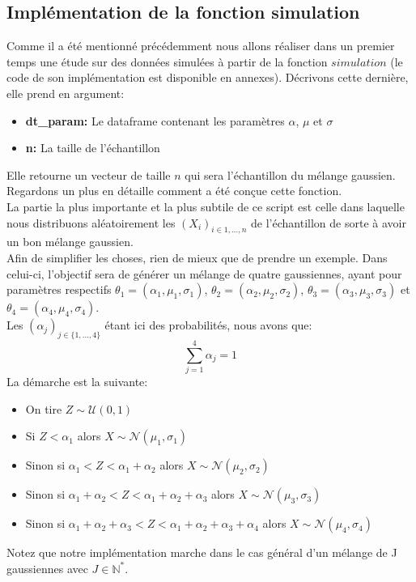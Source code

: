 \documentclass[a4paper,french,10pt]{article}
\begin{document}
\subsection{Implémentation de la fonction simulation}
Comme il a été mentionné précédemment nous allons réaliser dans un premier temps une étude sur des données simulées à partir de la fonction $simulation$ (le code de son implémentation est disponible en annexes). Décrivons cette dernière, elle prend en argument:
\begin{itemize}
	\item \textbf{dt\_param:} Le dataframe contenant les paramètres $\alpha$, $\mu$ et $\sigma$
	\item \textbf{n:} La taille de l'échantillon
\end{itemize}
Elle retourne un vecteur de taille $n$ qui sera l'échantillon du mélange gaussien. \\ Regardons un plus en détaille comment a été conçue cette fonction. \\
La partie la plus importante et la plus subtile de ce script est celle dans laquelle nous distribuons aléatoirement les $(X_i)_{i \in 1,\dots,n}$ de l'échantillon de sorte à avoir un bon mélange gaussien. \\
Afin de simplifier les choses, rien de mieux que de prendre un exemple. Dans celui-ci, l'objectif sera de générer un mélange de quatre gaussiennes, ayant pour paramètres respectifs $\theta_1 = (\alpha_1, \mu_1, \sigma_1)$, $\theta_2 = (\alpha_2, \mu_2, \sigma_2)$, $\theta_3 = (\alpha_3, \mu_3, \sigma_3)$ et $\theta_4 = (\alpha_4, \mu_4, \sigma_4)$. \\
Les $(\alpha_j)_{j \in \{1,\dots,4\}}$ étant ici des probabilités, nous avons que:
\[
	\sum_{j=1}^{4} \alpha_{j} = 1
\]
La démarche est la suivante:
\begin{itemize}
	\item On tire $Z \sim \mathcal{U}(0,1)$
	\item Si $Z < \alpha_1$ alors $X \sim \mathcal{N}(\mu_1, \sigma_1)$
	\item Sinon si $\alpha_1 < Z < \alpha_1 + \alpha_2$ alors $X \sim \mathcal{N}(\mu_2, \sigma_2)$
	\item Sinon si $\alpha_1 + \alpha_2 < Z < \alpha_1 + \alpha_2 + \alpha_3$ alors $X \sim \mathcal{N}(\mu_3, \sigma_3)$
	\item Sinon si $\alpha_1 + \alpha_2 + \alpha_3 < Z < \alpha_1 + \alpha_2 + \alpha_3 + \alpha_4$ alors $X \sim \mathcal{N}(\mu_4, \sigma_4)$
\end{itemize}
Notez que notre implémentation marche dans le cas général d'un mélange de J gaussiennes avec $J \in \mathbb{N}^{*}$.
\end{document}
